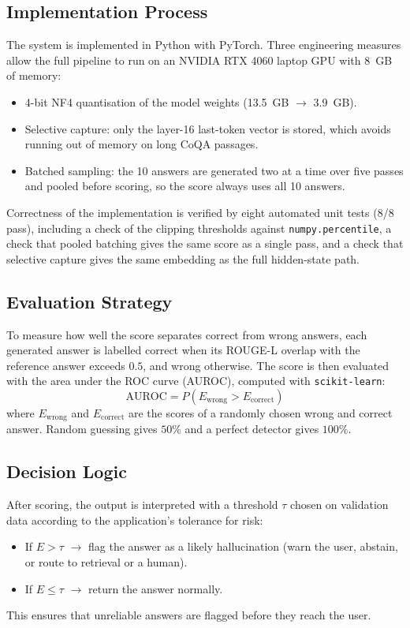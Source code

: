 \documentclass[journal]{IEEEtran}
\begin{document}
\subsection{Implementation Process}
The system is implemented in Python with PyTorch. Three engineering measures allow the full pipeline to run on an NVIDIA RTX 4060 laptop GPU with 8~GB of memory:
\begin{itemize}
\item 4-bit NF4 quantisation of the model weights (13.5~GB $\rightarrow$ 3.9~GB).
\item Selective capture: only the layer-16 last-token vector is stored, which avoids running out of memory on long CoQA passages.
\item Batched sampling: the 10 answers are generated two at a time over five passes and pooled before scoring, so the score always uses all 10 answers.
\end{itemize}
Correctness of the implementation is verified by eight automated unit tests (8/8 pass), including a check of the clipping thresholds against \texttt{numpy.percentile}, a check that pooled batching gives the same score as a single pass, and a check that selective capture gives the same embedding as the full hidden-state path.

\subsection{Evaluation Strategy}
To measure how well the score separates correct from wrong answers, each generated answer is labelled correct when its ROUGE-L overlap with the reference answer exceeds $0.5$, and wrong otherwise. The score is then evaluated with the area under the ROC curve (AUROC), computed with \texttt{scikit-learn}:
\begin{equation}
\mathrm{AUROC}=P\left(E_{\text{wrong}}>E_{\text{correct}}\right)
\end{equation}
where $E_{\text{wrong}}$ and $E_{\text{correct}}$ are the scores of a randomly chosen wrong and correct answer. Random guessing gives $50\%$ and a perfect detector gives $100\%$.

\subsection{Decision Logic}
After scoring, the output is interpreted with a threshold $\tau$ chosen on validation data according to the application's tolerance for risk:
\begin{itemize}
\item If $E>\tau$ $\rightarrow$ flag the answer as a likely hallucination (warn the user, abstain, or route to retrieval or a human).
\item If $E\le\tau$ $\rightarrow$ return the answer normally.
\end{itemize}
This ensures that unreliable answers are flagged before they reach the user.
\end{document}
